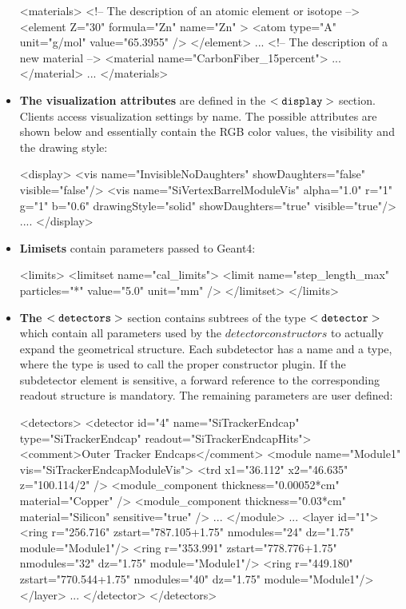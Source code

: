 \documentclass[10pt,a4paper]{article}
\begin{document}
\begin{itemize}
\begin{code}
<materials>
  <!-- The description of an atomic element or isotope -->
  <element Z="30" formula="Zn" name="Zn" >
    <atom type="A" unit="g/mol" value="65.3955" />
  </element>
  ...
  <!-- The description of a new material               -->
  <material name="CarbonFiber_15percent">
    ...
  </material>
  ...
</materials>
\end{code}

\item {\bf{The visualization attributes}} are defined in the $\tt<display>$ section.
    Clients access visualization settings by name. The possible attributes are shown
    below and essentially contain the RGB color values, the visibility and the drawing style:

\begin{code}
<display>
    <vis name="InvisibleNoDaughters"      showDaughters="false" visible="false"/>
    <vis name="SiVertexBarrelModuleVis" 
         alpha="1.0" r="1" g="1" b="0.6" 
         drawingStyle="solid" 
         showDaughters="true" 
         visible="true"/>
    ....
</display>
\end{code}

\item {\bf{Limisets}} contain parameters passed to Geant4:

\begin{code}
<limits>
    <limitset name="cal_limits">
        <limit name="step_length_max" particles="*" value="5.0" unit="mm" />
    </limitset>
</limits>
\end{code}

\item {\bf{The $\tt<detectors>$}} section contains subtrees of the type $\tt<detector>$ 
    which contain all parameters used by the $detector constructors$
    to actually expand the geometrical structure. Each subdetector has a name and a type,
    where the type is used to call the proper constructor plugin. If the subdetector 
    element is sensitive, a forward reference to the corresponding readout structure
    is mandatory. The remaining parameters are user defined:

\begin{code}
<detectors>
  <detector id="4" name="SiTrackerEndcap" type="SiTrackerEndcap" readout="SiTrackerEndcapHits">
    <comment>Outer Tracker Endcaps</comment>
    <module name="Module1" vis="SiTrackerEndcapModuleVis">
      <trd x1="36.112" x2="46.635" z="100.114/2" />
      <module_component thickness="0.00052*cm"   material="Copper" />
      <module_component thickness="0.03*cm"   material="Silicon" sensitive="true" />
      ...
    </module> 
    ...
    <layer id="1">
      <ring r="256.716" zstart="787.105+1.75" nmodules="24" dz="1.75" module="Module1"/>
      <ring r="353.991" zstart="778.776+1.75" nmodules="32" dz="1.75" module="Module1"/>
      <ring r="449.180" zstart="770.544+1.75" nmodules="40" dz="1.75" module="Module1"/>
    </layer>
    ...
  </detector>
</detectors>
\end{code}


\end{itemize}
\end{document}
